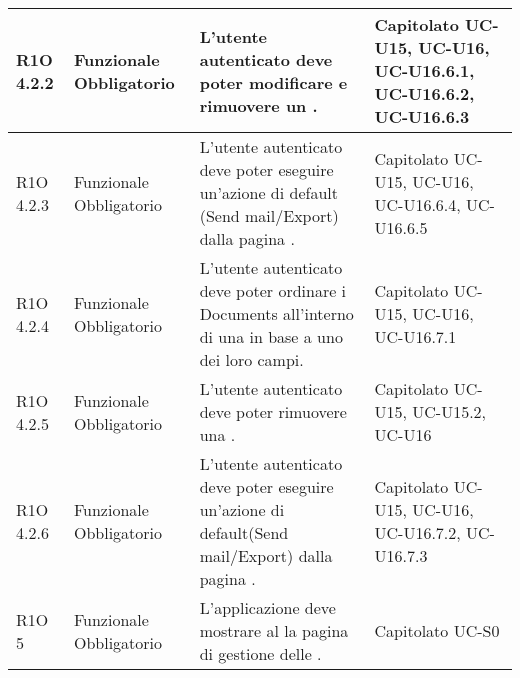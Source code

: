 \begin{center}
\begin{longtable}{ | l | p{2cm} | p{4.7cm} | p{2.5cm} |}
	R1O 4.2.2 & Funzionale \newline Obbligatorio & L’utente autenticato deve poter modificare e rimuovere un \glossaryItem{Document}. &  Capitolato \newline UC-U15, UC-U16, UC-U16.6.1, UC-U16.6.2, UC-U16.6.3  \newline  \\ \hline
	
	R1O 4.2.3 & Funzionale \newline Obbligatorio & L’utente autenticato deve poter eseguire un’azione di default (Send mail/Export) dalla pagina \glossaryItem{Document}.&  Capitolato \newline UC-U15, UC-U16, UC-U16.6.4, UC-U16.6.5  \newline  \\ \hline
	
	R1O 4.2.4 & Funzionale \newline Obbligatorio & L’utente autenticato deve poter ordinare i Documents all’interno di una \glossaryItem{Collection} in base a uno dei loro campi. &  Capitolato \newline UC-U15, UC-U16, UC-U16.7.1  \newline  \\ \hline
	
	R1O 4.2.5 & Funzionale \newline Obbligatorio & L’utente autenticato deve poter rimuovere una \glossaryItem{Collection}. &  Capitolato \newline UC-U15, UC-U15.2, UC-U16  \newline  \\ \hline
	
	R1O 4.2.6 & Funzionale \newline Obbligatorio & L’utente autenticato deve poter eseguire un’azione di default(Send mail/Export) dalla pagina \glossaryItem{Collection}. &  Capitolato \newline UC-U15, UC-U16, UC-U16.7.2, UC-U16.7.3  \newline  \\ \hline
	
	R1O 5 & Funzionale \newline Obbligatorio & L'applicazione deve mostrare al \glossaryItem{Super-Admin} la pagina di gestione delle \glossaryItem{Company}. &  Capitolato \newline UC-S0  \newline  \\ \hline
	

\end{longtable}
\end{center}

